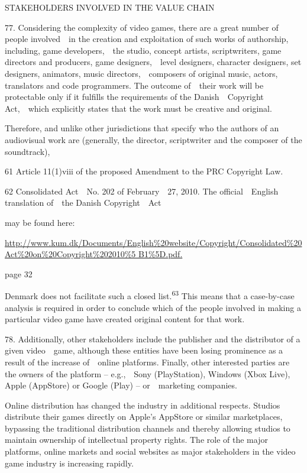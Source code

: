 \documentclass[
]{article}
\begin{document}
{STAKEHOLDERS INVOLVED IN THE VALUE CHAIN}

{77. }{Considering the complexity of video games, there are a great
number of people involved~~in the creation and exploitation of such
works of authorship, including, game developers,~~the studio, concept
artists, scriptwriters, game directors and producers, game
designers,~~level designers, character designers, set designers,
animators, music directors,~~composers of original music, actors,
translators and code programmers. The outcome of~~their work will be
protectable only if it fulfills the requirements of the
Danish~~}{Copyright Act}{,~~which explicitly states that the work must
be creative and original.}

{Therefore, and unlike other jurisdictions that specify who the authors
of an audiovisual work are (generally, the director, scriptwriter and
the composer of the soundtrack),}

{61 }{Article 11(1)viii of the proposed Amendment to the PRC }{Copyright
Law}{.}

{62 }{Consolidated Act~~No. 202 of February~~27, 2010. The
official~~English translation of~~the Danish }{Copyright~~Act}

{may be found here:}

\href{http://www.kum.dk/Documents/English\%20website/Copyright/Consolidated\%20Act\%20on\%20Copyright\%202010\%5}{{http://www.kum.dk/Documents/English\%20website/Copyright/Consolidated\%20Act\%20on\%20Copyright\%202010\%5
B1\%5D.pdf.}}

{page 32}

{Denmark does not facilitate such a closed list.}\textsuperscript{{63
}}{This means that a case-by-case analysis is required in order to
conclude which of the people involved in making a particular video game
have created original content for that work.}

{78. }{Additionally, other stakeholders include the publisher and the
distributor of a given video~~game, although these entities have been
losing prominence as a result of the increase of~~online platforms.
Finally, other interested parties are the owners of the platform }{--
}{e.g.,~~Sony (PlayStation), Windows (Xbox Live), Apple (AppStore) or
Google (Play) }{-- }{or~~marketing companies.}

{Online distribution has changed the industry in additional respects.
Studios distribute their }{games directly on Apple's AppStore or similar
marketplac}{es, bypassing the traditional distribution channels and
thereby allowing studios to maintain ownership of intellectual property
rights. The role of the major platforms, online markets and social
websites as major stakeholders in the video game industry is increasing
rapidly.}
\end{document}
